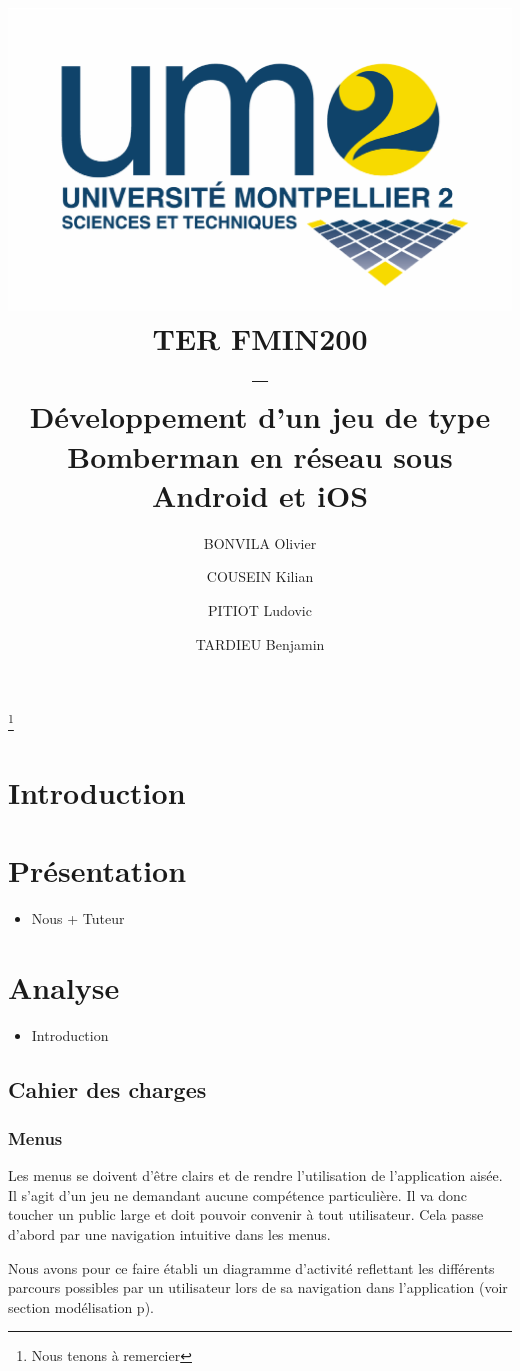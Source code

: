 \documentclass[a4paper,11pt]{report}
\title{
	\includegraphics[scale=.2]{logofds.eps}\\
	\vspace*{1cm}
	TER FMIN200 \\ 
	-- \\
	Développement d'un jeu de type Bomberman en réseau sous Android et iOS
}
\author{BONVILA Olivier \and COUSEIN Kilian \and PITIOT Ludovic \and TARDIEU Benjamin}
\date{}
\begin{document}
\maketitle

\thanks{

  Nous tenons à remercier 

}


\tableofcontents

\chapter{Introduction}

	

\chapter{Présentation}

	\begin{itemize}
		\item{Nous + Tuteur}
	\end{itemize}

	
	
	
\chapter{Analyse}
	\begin{itemize}
		\item{Introduction}
	\end{itemize}
	
	\section{Cahier des charges}
		\subsection{Menus}
		
		Les menus se doivent d'être clairs et de rendre l'utilisation de
		l'application aisée. Il s'agit d'un jeu ne demandant aucune compétence
		particulière. Il va donc toucher un public large et doit pouvoir convenir à
		tout utilisateur. Cela passe d'abord par une navigation intuitive dans les
		menus.
		
		Nous avons pour ce faire établi un diagramme d'activité reflettant les
		différents parcours possibles par un utilisateur lors de sa navigation dans
		l'application (voir section modélisation p\pageref{activité}).
		
\end{document}
